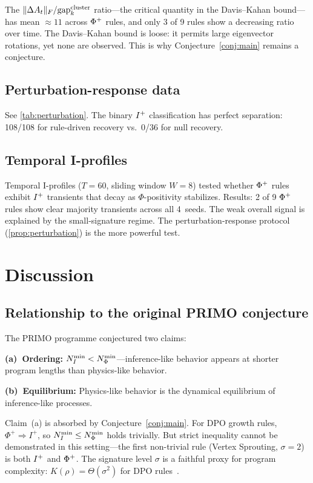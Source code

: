 \documentclass{../shared/primo}
\begin{document}
The $\|\Delta A_t\|_F / \mathrm{gap}_k^{\mathrm{cluster}}$ ratio---the critical quantity in the Davis--Kahan bound---has mean $\approx 11$ across $\Phi\textsuperscript{+}$ rules, and only 3 of 9 rules show a decreasing ratio over time. The Davis--Kahan bound is loose: it permits large eigenvector rotations, yet none are observed. This is why Conjecture~\ref{conj:main} remains a conjecture.

\subsection{Perturbation-response data}

See \cref{tab:perturbation}. The binary $I\textsuperscript{+}$ classification has perfect separation: 108/108 for rule-driven recovery vs.\ 0/36 for null recovery.

\subsection{Temporal I-profiles}

Temporal I-profiles ($T = 60$, sliding window $W = 8$) tested whether $\Phi\textsuperscript{+}$ rules exhibit $I\textsuperscript{+}$ transients that decay as $\Phi$-positivity stabilizes. Results: 2 of 9 $\Phi\textsuperscript{+}$ rules show clear majority transients across all 4~seeds. The weak overall signal is explained by the small-signature regime. The perturbation-response protocol (\cref{prop:perturbation}) is the more powerful test.


\section{Discussion}
\label{sec:discussion}

\subsection{Relationship to the original PRIMO conjecture}

The PRIMO programme conjectured two claims:

\textbf{(a)~Ordering:} $N_I^{\min} < N_\Phi^{\min}$---inference-like behavior appears at shorter program lengths than physics-like behavior.

\textbf{(b)~Equilibrium:} Physics-like behavior is the dynamical equilibrium of inference-like processes.

Claim~(a) is absorbed by Conjecture~\ref{conj:main}. For DPO growth rules, $\Phi^+ \Rightarrow I^+$, so $N_I^{\min} \leq N_\Phi^{\min}$ holds trivially. But strict inequality cannot be demonstrated in this setting---the first non-trivial rule (Vertex Sprouting, $\sigma = 2$) is both $I\textsuperscript{+}$ and $\Phi\textsuperscript{+}$. The signature level $\sigma$ is a faithful proxy for program complexity: $K(\rho) = \Theta(\sigma^2)$ for DPO rules~\cite{kowalczyk2026hierarchy}.
\end{document}
